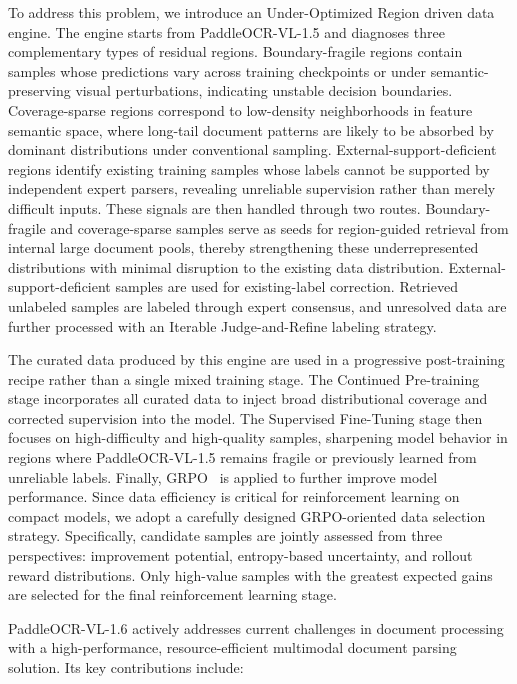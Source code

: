 \documentclass[11pt, a4paper,logo,  copyright, nonumbering]{paddleocr}
\begin{document}
To address this problem, we introduce an Under-Optimized Region driven data engine. The engine starts from PaddleOCR-VL-1.5 and diagnoses three complementary types of residual regions. Boundary-fragile regions contain samples whose predictions vary across training checkpoints or under semantic-preserving visual perturbations, indicating unstable decision boundaries. Coverage-sparse regions correspond to low-density neighborhoods in feature semantic space, where long-tail document patterns are likely to be absorbed by dominant distributions under conventional sampling. External-support-deficient regions identify existing training samples whose labels cannot be supported by independent expert parsers, revealing unreliable supervision rather than merely difficult inputs. These signals are then handled through two routes. Boundary-fragile and coverage-sparse samples serve as seeds for region-guided retrieval from internal large document pools, thereby strengthening these underrepresented distributions with minimal disruption to the existing data distribution. External-support-deficient samples are used for existing-label correction. Retrieved unlabeled samples are labeled through expert consensus, and unresolved data are further processed with an Iterable Judge-and-Refine labeling strategy.

The curated data produced by this engine are used in a progressive post-training recipe rather than a single mixed training stage. The Continued Pre-training stage incorporates all curated data to inject broad distributional coverage and corrected supervision into the model. The Supervised Fine-Tuning stage then focuses on high-difficulty and high-quality samples, sharpening model behavior in regions where PaddleOCR-VL-1.5 remains fragile or previously learned from unreliable labels. Finally, GRPO~\cite{shao2024deepseekmath} is applied to further improve model performance. Since data efficiency is critical for reinforcement learning on compact models, we adopt a carefully designed GRPO-oriented data selection strategy. Specifically, candidate samples are jointly assessed from three perspectives: improvement potential, entropy-based uncertainty, and rollout reward distributions. Only high-value samples with the greatest expected gains are selected for the final reinforcement learning stage. 

PaddleOCR-VL-1.6 actively addresses current challenges in document processing with a high-performance, resource-efficient multimodal document parsing solution. Its key contributions include:
\end{document}
